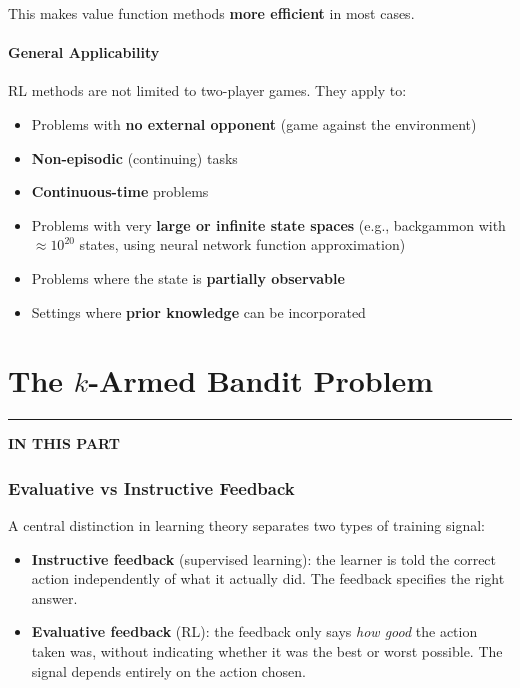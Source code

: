 \documentclass[11pt,a4paper]{article}
\theoremstyle{definition}
\theoremstyle{plain}
\theoremstyle{remark}
\newcommand{\partmtoc}{%
  \vspace{2pt}%
  {\color{rlrule}\rule{\linewidth}{0.5pt}}\par\vspace{3pt}%
  {\footnotesize\bfseries\color{rlaccent}IN THIS PART}\par\vspace{2pt}%
  \begingroup
  \etocsetnexttocdepth{subsection}%
  \localtableofcontents
  \endgroup
  \vspace{2pt}{\color{rlrule}\rule{\linewidth}{0.5pt}}\par\vspace{10pt}}
\begin{document}
This makes value function methods \textbf{more efficient} in most cases.

\subsection{General Applicability}

RL methods are not limited to two-player games. They apply to:
\begin{itemize}
    \item Problems with \textbf{no external opponent} (game against the environment)
    \item \textbf{Non-episodic} (continuing) tasks
    \item \textbf{Continuous-time} problems
    \item Problems with very \textbf{large or infinite state spaces} (e.g., backgammon with $\approx 10^{20}$ states, using neural network function approximation)
    \item Problems where the state is \textbf{partially observable}
    \item Settings where \textbf{prior knowledge} can be incorporated
\end{itemize}


\part{The $k$-Armed Bandit Problem}
\partmtoc

\section{Evaluative vs Instructive Feedback}

A central distinction in learning theory separates two types of training signal:

\begin{itemize}
    \item \textbf{Instructive feedback} (supervised learning): the learner is told the correct action independently of what it actually did. The feedback specifies the right answer.
    \item \textbf{Evaluative feedback} (RL): the feedback only says \emph{how good} the action taken was, without indicating whether it was the best or worst possible. The signal depends entirely on the action chosen.
\end{itemize}
\end{document}
